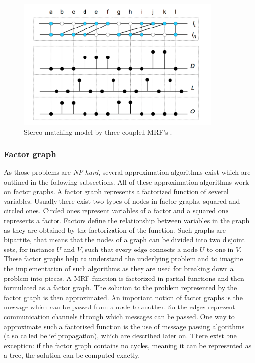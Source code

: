 \begin{figure}[h!]
  \centering
  \includegraphics[width=0.9\textwidth]{src/images/mrf-stereo-matching.png}
  \caption[Stereo matching model by three coupled MRF's]{Stereo matching model by three coupled MRF's \citep{sun2003stereo}.}
  \label{fig:mrf-stereo-matching}
\end{figure}

\subsubsection{Factor graph}

\noindent As those problems are \textit{NP-hard}, several approximation algorithms exist which are outlined in the following subsections.
All of these approximation algorithms work on factor graphs.
A factor graph represents a factorized function of several variables.
Usually there exist two types of nodes in factor graphs, squared and circled ones.
Circled ones represent variables of a factor and a squared one represents a factor.
Factors define the relationship between variables in the graph as they are obtained by the factorization of the function.
Such graphs are bipartite, that means that the nodes of a graph can be divided into two disjoint sets, for instance $U$ and $V$, such that every edge connects a node $U$ to one in $V$.
These factor graphs help to understand the underlying problem and to imagine the implementation of such algorithms as they are used for breaking down a problem into pieces.
\newline\newline\noindent A MRF function is factorized in partial functions and then formulated as a factor graph.
The solution to the problem represented by the factor graph is then approximated.
An important notion of factor graphs is the message which can be passed from a node to another.
So the edges represent communication channels through which messages can be passed.
One way to approximate such a factorized function is the use of message passing algorithms (also called belief propagation), which are described later on.
There exist one exception: if the factor graph contains no cycles, meaning it can be represented as a tree, the solution can be computed exactly.

